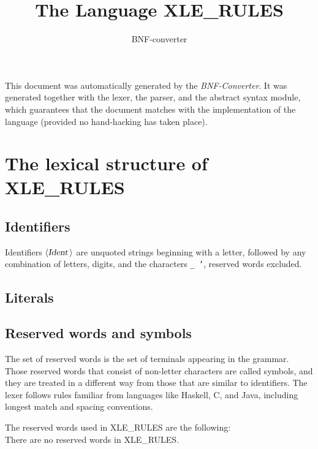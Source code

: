 \documentclass[a4paper,11pt]{article}
\author{BNF-converter}
\title{The Language XLE_RULES}
\begin{document}
\maketitle

\newcommand{\emptyP}{\mbox{$\epsilon$}}
\newcommand{\terminal}[1]{\mbox{{\texttt {#1}}}}
\newcommand{\nonterminal}[1]{\mbox{$\langle \mbox{{\sl #1 }} \! \rangle$}}
\newcommand{\arrow}{\mbox{::=}}
\newcommand{\delimit}{\mbox{$|$}}
\newcommand{\reserved}[1]{\mbox{{\texttt {#1}}}}
\newcommand{\literal}[1]{\mbox{{\texttt {#1}}}}
\newcommand{\symb}[1]{\mbox{{\texttt {#1}}}}

This document was automatically generated by the {\em BNF-Converter}. It was generated together with the lexer, the parser, and the abstract syntax module, which guarantees that the document matches with the implementation of the language (provided no hand-hacking has taken place).

\section*{The lexical structure of XLE_RULES}
\subsection*{Identifiers}
Identifiers \nonterminal{Ident} are unquoted strings beginning with a letter,
followed by any combination of letters, digits, and the characters {\tt \_ '},
reserved words excluded.


\subsection*{Literals}



\subsection*{Reserved words and symbols}
The set of reserved words is the set of terminals appearing in the grammar. Those reserved words that consist of non-letter characters are called symbols, and they are treated in a different way from those that are similar to identifiers. The lexer follows rules familiar from languages like Haskell, C, and Java, including longest match and spacing conventions.

The reserved words used in XLE_RULES are the following: \\

There are no reserved words in XLE_RULES.\\
\end{document}
